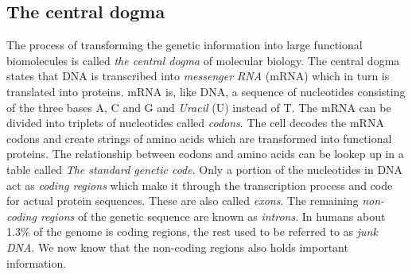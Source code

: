 \documentclass[thesis.tex]{subfiles}
\begin{document}
\subsection{The central dogma}
The process of transforming the genetic information into large functional biomolecules is called \textit{the central dogma} of molecular biology. The central dogma states that DNA is transcribed into \textit{messenger RNA} (mRNA) which in turn is translated into proteins. mRNA is, like DNA, a sequence of nucleotides consisting of the three bases A, C and G and \textit{Uracil} (U) instead of T. The mRNA can be divided into triplets of nucleotides called \textit{codons}. The cell decodes the mRNA codons and create strings of amino acids which are transformed into functional proteins. The relationship between codons and amino acids can be lookep up in a table called \textit{The standard genetic code}\cite[Chapter 1, p. 6]{introduction_to_genomics}. Only a portion of the nucleotides in DNA act as \textit{coding regions} which make it through the transcription process and code for actual protein sequences. These are also called \textit{exons}. The remaining \textit{non-coding regions} of the genetic sequence are known as \textit{introns}. In humans about 1.3\% of the genome is coding regions\cite[Chapter 4]{introduction_to_genomics}, the rest used to be referred to as \textit{junk DNA}. We now know that the non-coding regions also holds important information.
\end{document}
